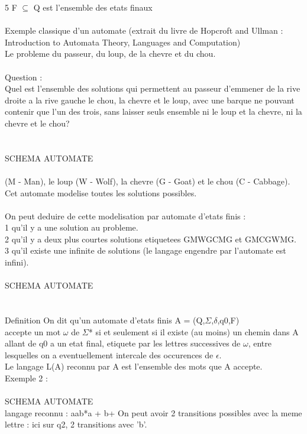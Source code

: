 \documentclass[5pt]{article}
\begin{document}
\begin{scriptsize}
5 F $\subseteq$ Q est l’ensemble des etats finaux\\
\\
Exemple classique d’un automate (extrait du livre de Hopcroft and Ullman : Introduction to Automata Theory, Languages and Computation)\\
Le probleme du passeur, du loup, de la chevre et du chou.\\
\\
Question :\\
Quel est l’ensemble des solutions qui permettent au passeur d’emmener de la rive droite a la rive gauche le chou, la chevre et le loup, avec une barque ne pouvant contenir que l’un des trois, sans laisser seuls ensemble ni le loup et la chevre, ni la chevre et le chou?\\
\\
\\
SCHEMA AUTOMATE\\
\\
(M - Man), le loup (W - Wolf), la chevre (G - Goat) et le chou (C - Cabbage). Cet automate modelise toutes les solutions possibles.\\
\\
On peut deduire de cette modelisation par automate d’etats finis :\\
1 qu’il y a une solution au probleme.\\
2 qu’il y a deux plus courtes solutions etiquetees GMWGCMG et GMCGWMG.\\
3 qu’il existe une infinite de solutions (le langage engendre par l’automate est infini).\\
\\
SCHEMA AUTOMATE\\
\\
\\
Definition On dit qu’un automate d’etats finis A = (Q,$\Sigma$,$\delta$,q0,F)\\
accepte un mot $\omega$ de $\Sigma$* si et seulement si il existe (au moins) un chemin dans A allant de q0 a un etat final, etiquete par les lettres successives de $\omega$, entre lesquelles on a eventuellement intercale des occurences de $\epsilon$.\\
Le langage L(A) reconnu par A est l’ensemble des mots que A accepte.
\\
Exemple 2 :\\
\\
SCHEMA AUTOMATE\\
langage reconnu : aab*a + b+ On peut avoir 2 transitions possibles avec la meme lettre : ici sur q2, 2 transitions avec 'b'.\\

\end{scriptsize}
\end{document}
